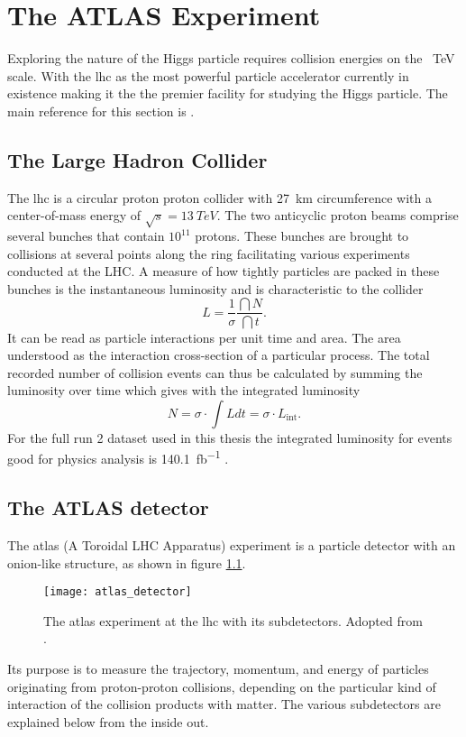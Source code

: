 \chapter{The ATLAS Experiment}\label{sec:atlas}
Exploring the nature of the Higgs particle requires collision energies on the \qty[]{}{TeV} scale. With the \ac{lhc} as the most powerful particle accelerator currently in existence making it the the premier facility for studying the Higgs particle. The main reference for this section is \citep{aad2008atlas}.

\section{The Large Hadron Collider}
The \ac{lhc} is a circular proton proton collider with \qty[]{27}{km} circumference with a center-of-mass energy of $\sqrt{s}=\qty[]{13}{TeV}$. The two anticyclic proton beams comprise several bunches that contain $10^{11}$ protons. These bunches are brought to collisions at several points along the ring facilitating various experiments conducted at the LHC. A measure of how tightly particles are packed in these bunches is the instantaneous luminosity and is characteristic to the collider
\begin{equation}
    L=\frac{1}{\sigma}\frac{\dint{N}}{\dint{t}}.
\end{equation}
It can be read as particle interactions per unit time and area. The area understood as the interaction cross-section of a particular process. The total recorded number of collision events can thus be calculated by summing the luminosity over time which gives with the integrated luminosity
\begin{equation}
    N=\sigma\cdot\int L dt=\sigma\cdot L_\mathrm{int}.
\end{equation}
For the full run 2 dataset used in this thesis the integrated luminosity for events good for physics analysis is \qty[]{140.1}{fb^{-1}} \citep{DAPR-2021-01}.

\section{The ATLAS detector}
The \ac{atlas} (A Toroidal LHC Apparatus) experiment is a particle detector with an onion-like structure, as shown in figure \ref{fig:atlas_detector}.
\begin{figure}
    \centering
    \texttt{[image: atlas\_detector]}
    \caption[]{The \ac{atlas} experiment at the \ac{lhc} with its subdetectors. Adopted from \citep{Pequenao:1095924}.}
    \label{fig:atlas_detector}
\end{figure}
Its purpose is to measure the trajectory, momentum, and energy of particles originating from proton-proton collisions, depending on the particular kind of interaction of the collision products with matter. The various subdetectors are explained below from the inside out.

